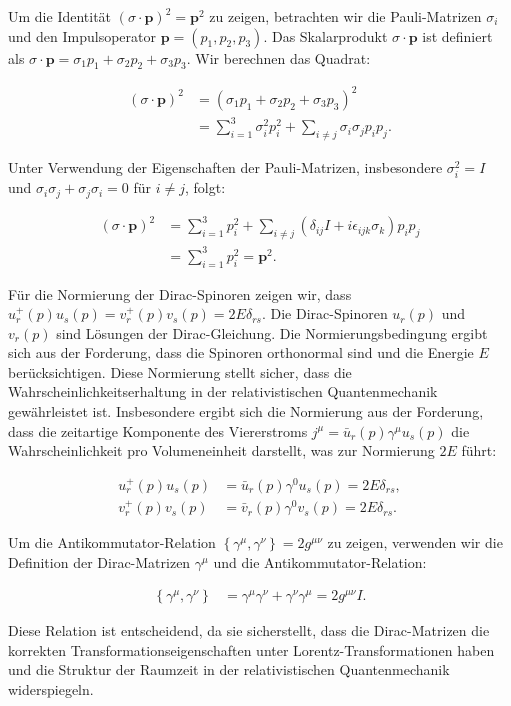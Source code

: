 Um die Identität $(\sigma \cdot \mathbf{p})^2 = \mathbf{p}^2$ zu zeigen, betrachten wir die Pauli-Matrizen $\sigma_i$ und den Impulsoperator $\mathbf{p} = (p_1, p_2, p_3)$. Das Skalarprodukt $\sigma \cdot \mathbf{p}$ ist definiert als $\sigma \cdot \mathbf{p} = \sigma_1 p_1 + \sigma_2 p_2 + \sigma_3 p_3$. Wir berechnen das Quadrat:

\begin{align*}
(\sigma \cdot \mathbf{p})^2 &= (\sigma_1 p_1 + \sigma_2 p_2 + \sigma_3 p_3)^2 \\
&= \sum_{i=1}^{3} \sigma_i^2 p_i^2 + \sum_{i \neq j} \sigma_i \sigma_j p_i p_j.
\end{align*}

Unter Verwendung der Eigenschaften der Pauli-Matrizen, insbesondere $\sigma_i^2 = I$ und $\sigma_i \sigma_j + \sigma_j \sigma_i = 0$ für $i \neq j$, folgt:

\begin{align*}
(\sigma \cdot \mathbf{p})^2 &= \sum_{i=1}^{3} p_i^2 + \sum_{i \neq j} (\delta_{ij} I + i \epsilon_{ijk} \sigma_k) p_i p_j \\
&= \sum_{i=1}^{3} p_i^2 = \mathbf{p}^2.
\end{align*}

Für die Normierung der Dirac-Spinoren zeigen wir, dass $u_r^{+}(p) u_s(p) = v_r^{+}(p) v_s(p) = 2 E \delta_{rs}$. Die Dirac-Spinoren $u_r(p)$ und $v_r(p)$ sind Lösungen der Dirac-Gleichung. Die Normierungsbedingung ergibt sich aus der Forderung, dass die Spinoren orthonormal sind und die Energie $E$ berücksichtigen. Diese Normierung stellt sicher, dass die Wahrscheinlichkeitserhaltung in der relativistischen Quantenmechanik gewährleistet ist. Insbesondere ergibt sich die Normierung aus der Forderung, dass die zeitartige Komponente des Viererstroms $j^\mu = \bar{u}_r(p) \gamma^\mu u_s(p)$ die Wahrscheinlichkeit pro Volumeneinheit darstellt, was zur Normierung $2E$ führt:

\begin{align*}
u_r^{+}(p) u_s(p) &= \bar{u}_r(p) \gamma^0 u_s(p) = 2 E \delta_{rs}, \\
v_r^{+}(p) v_s(p) &= \bar{v}_r(p) \gamma^0 v_s(p) = 2 E \delta_{rs}.
\end{align*}

Um die Antikommutator-Relation $\left\{\gamma^\mu, \gamma^\nu\right\} = 2 g^{\mu \nu}$ zu zeigen, verwenden wir die Definition der Dirac-Matrizen $\gamma^\mu$ und die Antikommutator-Relation:

\begin{align*}
\left\{\gamma^\mu, \gamma^\nu\right\} &= \gamma^\mu \gamma^\nu + \gamma^\nu \gamma^\mu = 2 g^{\mu \nu} I.
\end{align*}

Diese Relation ist entscheidend, da sie sicherstellt, dass die Dirac-Matrizen die korrekten Transformationseigenschaften unter Lorentz-Transformationen haben und die Struktur der Raumzeit in der relativistischen Quantenmechanik widerspiegeln.

